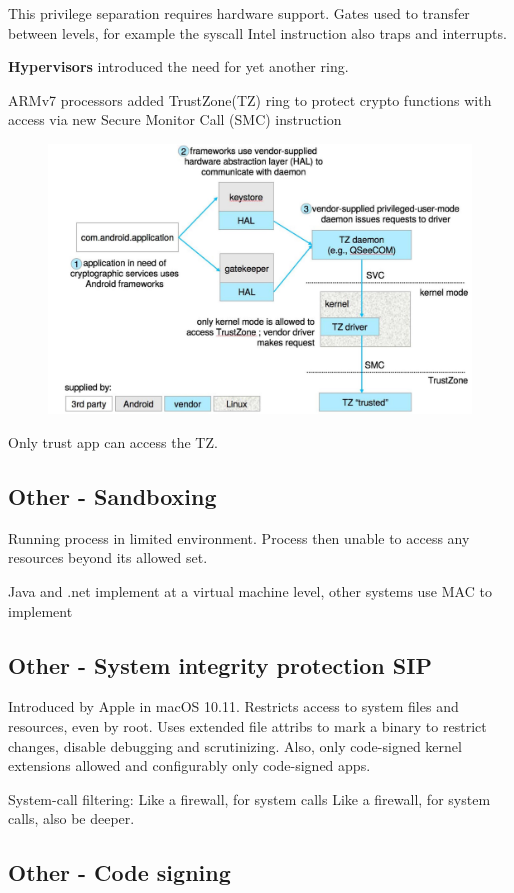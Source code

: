 This privilege separation requires hardware support. Gates used to transfer between levels, for example the syscall
Intel instruction also traps and interrupts.


\textbf{Hypervisors} introduced the need for yet another ring.

ARMv7 processors added TrustZone(TZ) ring to protect crypto
functions with access via new Secure Monitor Call (SMC)
instruction



\begin{figure}[h!]
    \centering
    \includegraphics[width=0.6\linewidth]{img/sddvv.png}
\end{figure}

Only trust app can access the TZ.

\subsection{Other - Sandboxing}

Running process in limited environment. Process then unable to access any resources beyond its allowed
set.

Java and .net implement at a virtual machine level, other systems use MAC to implement

\subsection{Other - System integrity protection SIP}

Introduced by Apple in macOS 10.11. Restricts access to system files and resources, even by root. Uses extended file attribs to mark a binary to restrict changes,
disable debugging and scrutinizing. Also, only code-signed kernel extensions allowed and configurably
only code-signed apps.

System-call filtering: Like a firewall, for system calls Like a firewall, for system calls, also be deeper.


\subsection{Other - Code signing}

